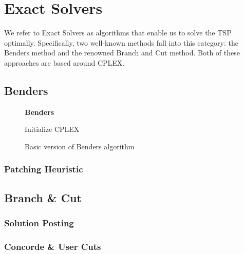 \chapter{Exact Solvers}

We refer to Exact Solvers as algorithms that enable us to solve the TSP optimally.
Specifically, two well-known methods fall into this category: the Benders method and the renowned Branch and Cut method.
Both of these approaches are based around CPLEX.

\section{Benders}

\begin{figure}[htbp]
	\textbf{Benders} \\
	\begin{algorithm}[H]
		\vspace{2mm}
		Initialize CPLEX\\
	\end{algorithm}
	\caption{Basic version of Benders algorithm} \label{fig:benders}
\end{figure}

\subsection{Patching Heuristic}

\section{Branch \& Cut}

\subsection{Solution Posting}

\subsection{Concorde \& User Cuts}
